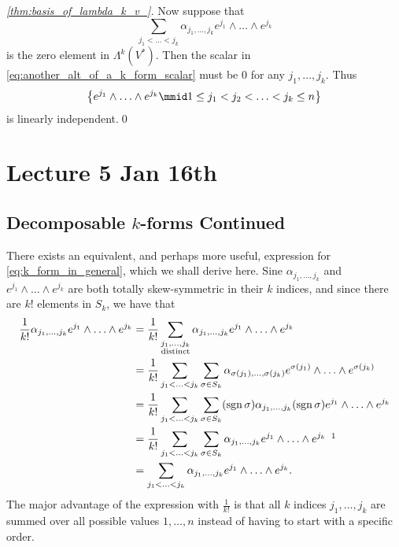 \documentclass[notoc,notitlepage]{tufte-book}
\DeclareMathOperator{\sgn}{sgn}
\begin{document}
\begin{proof}[\cref{thm:basis_of_lambda_k_v_}]
  Now suppose that
  \begin{equation*}
    \sum_{j_1 < \hdots < j_k} \alpha_{j_1, \ldots, j_k} e^{j_1} \land \hdots \land e^{j_k}
  \end{equation*}
  is the zero element in $\Lambda^k(V^*)$. Then the scalar in \cref{eq:another_alt_of_a_k_form_scalar} must be $0$ for any $j_1, \ldots, j_k$. Thus
  \begin{equation*}
    \left\{ e^{j_1} \land \hdots \land e^{j_k} \mmid 1 \leq j_1 < j_2 < \hdots < j_k \leq n \right\}
  \end{equation*}
  is linearly independent.\qed\
\end{proof}



\chapter{Lecture 5 Jan 16th}%
\label{chp:lecture_5_jan_16th}

\section{Decomposable \texorpdfstring{$k$}{k}-forms Continued}%
\label{sec:decomposable_k_forms_continued}

There exists an equivalent, and perhaps more useful, expression for \cref{eq:k_form_in_general},
which we shall derive here. Sine $\alpha_{j_1, \ldots, j_k}$ and
$e^{j_1} \land \hdots \land e^{j_k}$ are both totally skew-symmetric in their $k$ indices,
and since there are $k!$ elements in $S_k$, we have that
\begin{align*}
  \frac{1}{k!} \alpha_{j_1, \ldots, j_k} e^{j_1} \land \hdots \land e^{j_k}
  &= \frac{1}{k!} \sum_{\substack{j_1, \ldots, j_k \\ \text{distinct}}}
    \alpha_{j_1, \ldots, j_k} e^{j_1} \land \hdots \land e^{j_k} \\
  &= \frac{1}{k!} \sum_{j_1 < \hdots < j_k} \sum_{\sigma \in S_k}
    \alpha_{\sigma(j_1), \ldots, \sigma(j_k)} e^{\sigma(j_1)} \land \hdots \land e^{\sigma(j_k)} \\
  &= \frac{1}{k!} \sum_{j_1 < \hdots < j_k} \sum_{\sigma \in S_k} (\sgn \sigma)
    \alpha_{j_1, \ldots, j_k} (\sgn \sigma) e^{j_1} \land \hdots \land e^{j_k} \\
  &= \frac{1}{k!} \sum_{j_1 < \hdots < j_k} \sum_{\sigma \in S_k}
    \alpha_{j_1, \ldots, j_k} e^{j_1} \land \hdots \land e^{j_k} \enspace \footnotemark \\
  &= \sum_{j_1 < \hdots < j_k} \alpha_{j_1, \ldots, j_k} e^{j_1} \land \hdots \land e^{j_k}.
\end{align*}
\footnotetext{Note that $(\sgn \sigma)(\sgn \sigma) = 1$.}
The major advantage of the expression with $\frac{1}{k!}$ is that all $k$ indices
$j_1, \ldots, j_k$ are summed over all possible values $1, \ldots, n$ instead of
having to start with a specific order.
\end{document}
